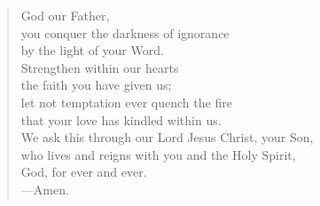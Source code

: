 \prayer

\setlength{\vleftmargin}{\prayerleftmargini}

\begin{verse}
God our Father,\\
you conquer the darkness of ignorance\\
by the light of your Word.\\
Strengthen within our hearts\\
the faith you have given us;\\
let not temptation ever quench the fire\\
that your love has kindled within us.\\
We ask this through our Lord Jesus Christ, your Son,\\
who lives and reigns with you and the Holy Spirit,\\
God, for ever and ever.\\
{\color{red}---\thinspace}Amen.
\end{verse}

\setlength{\vleftmargin}{\defleftmargini}
